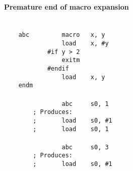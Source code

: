         \clearpage
        \paragraph{Premature end of macro expansion}
            ~\\
            \verb'    abc         macro   x, y'\\
            \verb'                load    x, #y'\\
            \verb'            #if y > 2'\\
            \verb'                exitm'\\
            \verb'            #endif'\\
            \verb'                load    x, y'\\
            \verb'    endm'\\
            \verb''\\
            \verb'                abc     s0, 1'\\
            \verb'        ; Produces:'\\
            \verb'        ;       load    s0, #1'\\
            \verb'        ;       load    s0, 1'\\
            \verb''\\
            \verb'                abc     s0, 3'\\
            \verb'        ; Produces:'\\
            \verb'        ;       load    s0, #1'\\

